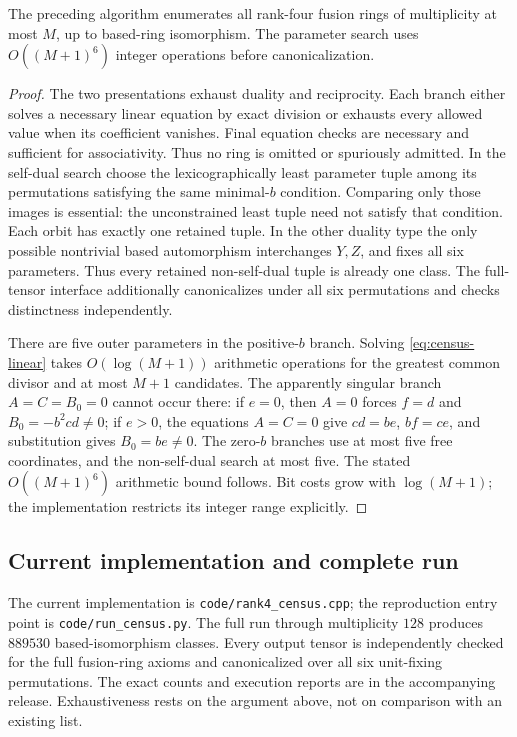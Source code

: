 \documentclass[11pt,a4paper]{article}
\theoremstyle{definition}\newtheorem{definition}[theorem]{Definition}\newtheorem{remark}[theorem]{Remark}
\begin{document}
\begin{proposition}\label{prop:census}
The preceding algorithm enumerates all rank-four fusion rings of
multiplicity at most $M$, up to based-ring isomorphism. The parameter
search uses $O((M+1)^6)$ integer operations before canonicalization.
\end{proposition}
\begin{proof}
The two presentations exhaust duality and reciprocity. Each branch either
solves a necessary linear equation by exact division or exhausts every
allowed value when its coefficient vanishes. Final equation checks are
necessary and sufficient for associativity. Thus no ring is omitted or
spuriously admitted. In the self-dual search choose the lexicographically
least parameter tuple among its permutations satisfying the same
minimal-$b$ condition. Comparing only those images is essential: the
unconstrained least tuple need not satisfy that condition. Each orbit has
exactly one retained tuple. In the other duality type the only possible
nontrivial based automorphism interchanges $Y,Z$, and fixes all six
parameters. Thus every retained non-self-dual tuple is already one class.
The full-tensor interface additionally canonicalizes under all six
permutations and checks distinctness independently.

There are five outer parameters in the positive-$b$ branch. Solving
\eqref{eq:census-linear} takes $O(\log(M+1))$ arithmetic operations for
the greatest common divisor and at most $M+1$ candidates. The apparently
singular branch $A=C=B_0=0$ cannot occur there: if $e=0$, then
$A=0$ forces $f=d$ and $B_0=-b^2cd\ne0$; if $e>0$, the equations
$A=C=0$ give $cd=be$, $bf=ce$, and substitution gives $B_0=be\ne0$.
The zero-$b$ branches use at most five free coordinates, and the
non-self-dual search at most five. The stated $O((M+1)^6)$ arithmetic
bound follows. Bit costs grow with $\log(M+1)$; the implementation
restricts its integer range explicitly.
\end{proof}

\subsection{Current implementation and complete run}
The current implementation is \texttt{code/rank4\_census.cpp}; the
reproduction entry point is \texttt{code/run\_census.py}. The full
run through multiplicity $128$ produces $889530$ based-isomorphism
classes. Every output tensor is independently checked for the full
fusion-ring axioms and canonicalized over all six unit-fixing
permutations. The exact counts and execution reports are in the
accompanying release. Exhaustiveness rests on the argument above,
not on comparison with an existing list.
\end{document}

